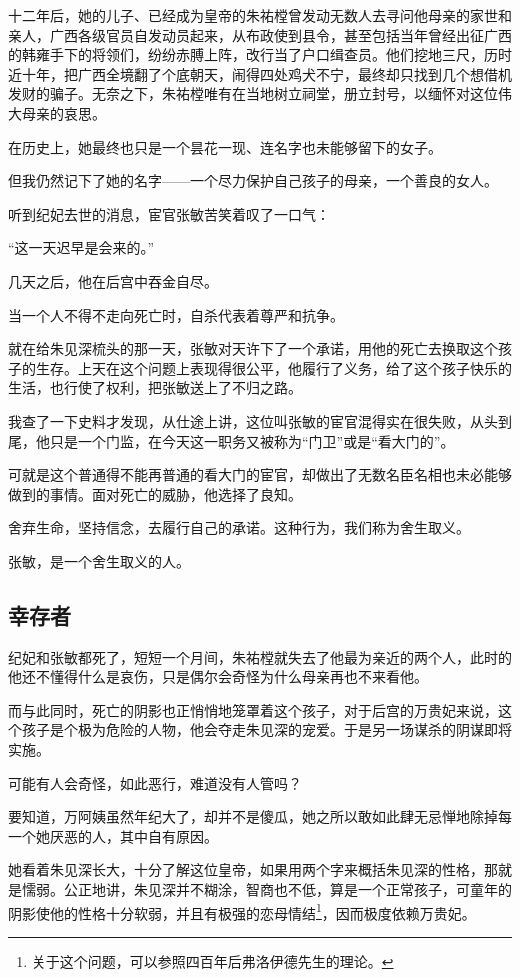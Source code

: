 \begin{multicols}{\theparacolNo}
十二年后，她的儿子、已经成为皇帝的朱祐樘曾发动无数人去寻问他母亲的家世和亲人，广西各级官员自发动员起来，从布政使到县令，甚至包括当年曾经出征广西的韩雍手下的将领们，纷纷赤膊上阵，改行当了户口缉查员。他们挖地三尺，历时近十年，把广西全境翻了个底朝天，闹得四处鸡犬不宁，最终却只找到几个想借机发财的骗子。无奈之下，朱祐樘唯有在当地树立祠堂，册立封号，以缅怀对这位伟大母亲的哀思。

在历史上，她最终也只是一个昙花一现、连名字也未能够留下的女子。

但我仍然记下了她的名字——一个尽力保护自己孩子的母亲，一个善良的女人。

听到纪妃去世的消息，宦官张敏苦笑着叹了一口气：

“这一天迟早是会来的。”

几天之后，他在后宫中吞金自尽。

当一个人不得不走向死亡时，自杀代表着尊严和抗争。

就在给朱见深梳头的那一天，张敏对天许下了一个承诺，用他的死亡去换取这个孩子的生存。上天在这个问题上表现得很公平，他履行了义务，给了这个孩子快乐的生活，也行使了权利，把张敏送上了不归之路。

我查了一下史料才发现，从仕途上讲，这位叫张敏的宦官混得实在很失败，从头到尾，他只是一个门监，在今天这一职务又被称为“门卫”或是“看大门的”。

可就是这个普通得不能再普通的看大门的宦官，却做出了无数名臣名相也未必能够做到的事情。面对死亡的威胁，他选择了良知。

舍弃生命，坚持信念，去履行自己的承诺。这种行为，我们称为舍生取义。

张敏，是一个舍生取义的人。

\subsection{幸存者}
纪妃和张敏都死了，短短一个月间，朱祐樘就失去了他最为亲近的两个人，此时的他还不懂得什么是哀伤，只是偶尔会奇怪为什么母亲再也不来看他。

而与此同时，死亡的阴影也正悄悄地笼罩着这个孩子，对于后宫的万贵妃来说，这个孩子是个极为危险的人物，他会夺走朱见深的宠爱。于是另一场谋杀的阴谋即将实施。

可能有人会奇怪，如此恶行，难道没有人管吗？

要知道，万阿姨虽然年纪大了，却并不是傻瓜，她之所以敢如此肆无忌惮地除掉每一个她厌恶的人，其中自有原因。

她看着朱见深长大，十分了解这位皇帝，如果用两个字来概括朱见深的性格，那就是懦弱。公正地讲，朱见深并不糊涂，智商也不低，算是一个正常孩子，可童年的阴影使他的性格十分软弱，并且有极强的恋母情结\footnote{关于这个问题，可以参照四百年后弗洛伊德先生的理论。}，因而极度依赖万贵妃。


\end{multicols}
